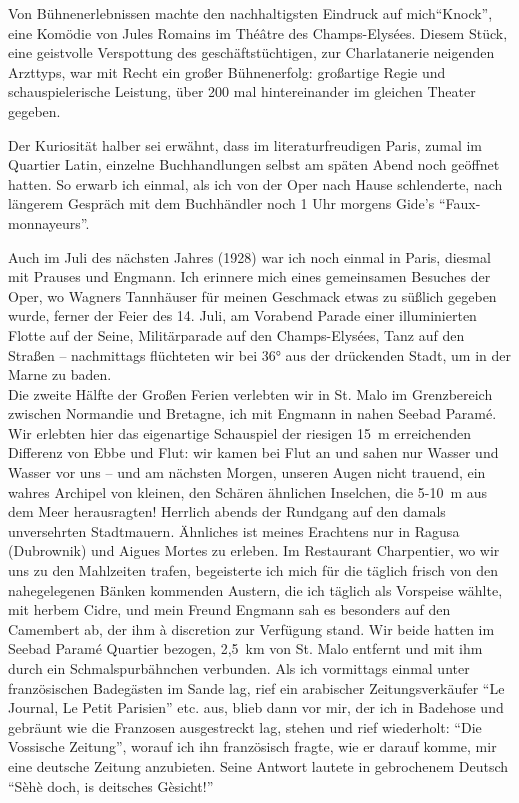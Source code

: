 Von Bühnenerlebnissen machte den nachhaltigsten Eindruck auf mich\linebreak \enquote{Knock}, eine Komödie von Jules Romains im Théâtre des Champs-Elysées. Diesem Stück, eine geistvolle Verspottung des geschäftstüchtigen, zur Charlatanerie neigenden Arzttyps, war mit Recht ein großer Bühnenerfolg: großartige Regie und schauspielerische Leistung, über 200 mal hintereinander im gleichen Theater gegeben.

Der Kuriosität halber sei erwähnt, dass im literaturfreudigen Paris, zumal im Quartier Latin, einzelne Buchhandlungen selbst am späten Abend noch geöffnet hatten. So erwarb ich einmal, als ich von der Oper nach Hause schlenderte, nach längerem Gespräch mit dem Buchhändler noch 1 Uhr morgens Gide's \enquote{Faux-monnayeurs}.

Auch im Juli des nächsten Jahres (1928) war ich noch einmal in Paris, diesmal mit Prauses und Engmann. Ich erinnere mich eines gemeinsamen Besuches der Oper, wo Wagners Tannhäuser für meinen Geschmack etwas zu süßlich gegeben wurde, ferner der Feier des 14. Juli, am Vorabend Parade einer illuminierten Flotte auf der Seine, Militärparade auf den Champs-Elysées, Tanz auf den Straßen -- nachmittags flüchteten wir bei 36° aus der drückenden Stadt, um in der Marne zu baden.\\

Die zweite Hälfte der Großen Ferien verlebten wir in St. Malo im Grenzbereich zwischen Normandie und Bretagne, ich mit Engmann in nahen Seebad Paramé. Wir erlebten hier das eigenartige Schauspiel der riesigen 15~m erreichenden Differenz von Ebbe und Flut: wir kamen bei Flut an und sahen nur Wasser und Wasser vor uns -- und am nächsten Morgen, unseren Augen nicht trauend, ein wahres Archipel von kleinen, den Schären ähnlichen Inselchen, die 5-10~m aus dem Meer herausragten! Herrlich abends der Rundgang auf den damals unversehrten Stadtmauern. Ähnliches ist meines Erachtens nur in Ragusa (Dubrownik) und Aigues Mortes zu erleben. Im Restaurant Charpentier, wo wir uns zu den Mahlzeiten trafen, begeisterte ich mich für die täglich frisch von den nahegelegenen Bänken kommenden Austern, die ich täglich als Vorspeise wählte, mit herbem Cidre, und mein Freund Engmann sah es besonders auf den Camembert ab, der ihm à discretion zur Verfügung stand. Wir beide hatten im Seebad Paramé Quartier bezogen, 2,5~km von St. Malo entfernt und mit ihm durch ein Schmalspurbähnchen verbunden. Als ich vormittags einmal unter französischen Badegästen im Sande lag, rief ein arabischer Zeitungsverkäufer \enquote{Le Journal, Le Petit Parisien} etc. aus, blieb dann vor mir, der ich in Badehose und gebräunt wie die Franzosen ausgestreckt lag, stehen und rief wiederholt: \enquote{Die Vossische Zeitung}, worauf ich ihn französisch fragte, wie er darauf komme, mir eine deutsche Zeitung anzubieten. Seine Antwort lautete in gebrochenem Deutsch \enquote{Sèhè doch, is deitsches Gèsicht!}

